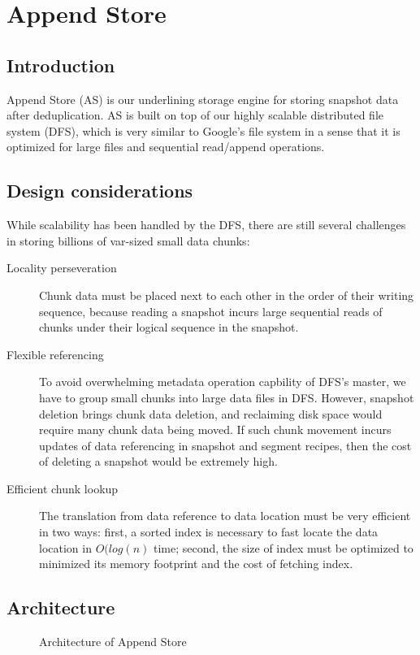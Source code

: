 \section{Append Store}
\label{sect:append}
\subsection{Introduction}
Append Store (AS) is our underlining storage engine for storing snapshot data after deduplication. 
AS is built on top of our highly scalable distributed file system (DFS), 
which is very similar to Google's file system
in a sense that it is optimized for large files and sequential read/append operations.

\subsection{Design considerations}
While scalability has been handled by the DFS, there are still several challenges in 
storing billions of var-sized small data chunks:
\begin{description}
\item[Locality perseveration] Chunk data must be placed next to each other in the order of their writing sequence,
because reading a snapshot incurs large sequential reads of chunks under their logical sequence in the snapshot.
\item[Flexible referencing] To avoid overwhelming metadata operation capbility of DFS's master, 
we have to group small chunks into large data files in DFS.
However, snapshot deletion brings chunk data deletion, and reclaiming disk space would require many chunk data being moved.
If such chunk movement incurs updates of data referencing in snapshot and segment recipes, then the cost of deleting 
a snapshot would be extremely high.
\item[Efficient chunk lookup] The translation from data reference to data location must be very efficient in two ways: 
first, a sorted index is necessary to fast locate the data location in $O(log(n)$ time; 
second, the size of index must be optimized to minimized its memory footprint and the cost of fetching index. 
\end{description}



\subsection{Architecture}
\begin{figure}[htbp]
  \centering
  \caption{Architecture of Append Store}
  \label{fig:as_arch}
\end{figure}

